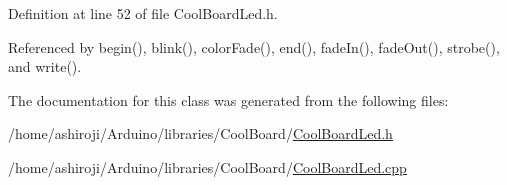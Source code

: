 Definition at line 52 of file Cool\+Board\+Led.\+h.



Referenced by begin(), blink(), color\+Fade(), end(), fade\+In(), fade\+Out(), strobe(), and write().



The documentation for this class was generated from the following files\+:\begin{DoxyCompactItemize}
\item 
/home/ashiroji/\+Arduino/libraries/\+Cool\+Board/\hyperlink{CoolBoardLed_8h}{Cool\+Board\+Led.\+h}\item 
/home/ashiroji/\+Arduino/libraries/\+Cool\+Board/\hyperlink{CoolBoardLed_8cpp}{Cool\+Board\+Led.\+cpp}\end{DoxyCompactItemize}
